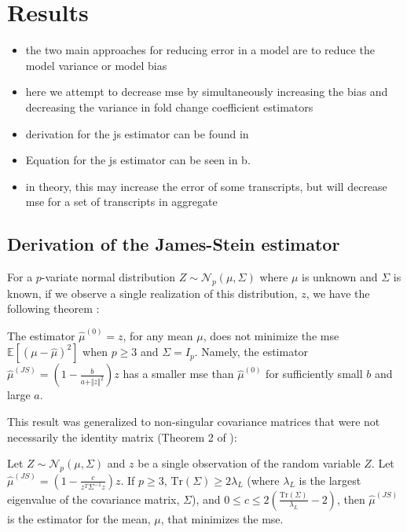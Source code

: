 \section{Results}

\begin{itemize}
  \item the two main approaches for reducing error in a model are to reduce the model variance or model bias 
  \item here we attempt to decrease \gls{mse} by simultaneously increasing the bias and decreasing the variance in fold change coefficient estimators
  \item derivation for the \gls{js} estimator can be found in 
  \item Equation for the \gls{js} estimator can be seen in b. 
  \item in theory, this may increase the error of some transcripts, but will decrease \gls{mse} for a set of transcripts in aggregate 
\end{itemize}

\subsection{Derivation of the James-Stein estimator}
\label{sec:JS_derivation}

For a $p$-variate normal distribution $Z \sim \mathcal{N}_p(\mu, \Sigma)$ where $\mu$ is unknown and $\Sigma$ is known, if we observe a single realization of this distribution, $z$, we have the following theorem \cite{steinInadmissibilityUsualEstimator1956}:

\begin{theorem}
  The estimator $\hat{\mu}^{(0)} = z$, for any mean $\mu$, does not minimize the \gls{mse} $\mathbb{E} \left[ (\mu - \hat{\mu})^2 \right]$ when $p \ge 3$ and $\Sigma = I_p$. Namely, the estimator $\hat{\mu}^{(JS)} = \left( 1 - \frac{b}{a + \Vert z \Vert ^2}\right) z$ has a smaller \gls{mse} than $\hat{\mu}^{(0)}$ for sufficiently small $b$ and large $a$.
\end{theorem}

This result was generalized to non-singular covariance matrices that were not necessarily the identity matrix (Theorem 2 of \cite[REF][]{bockMinimaxEstimatorsMean1975}):

\begin{theorem}
  Let $Z \sim \mathcal{N}_p \left(\mu, \Sigma \right)$ and $z$ be a single observation of the random variable $Z$.
  Let $\hat{\mu}^{(JS)} = \left( 1 - \frac{c}{z^T \Sigma^{-1} z}\right) z$.
If $p \ge 3$, $\text{Tr}(\Sigma) \ge 2 \lambda_L$ (where $\lambda_L$ is the largest eigenvalue of the covariance matrix, $\Sigma$), and $0 \le c \le 2 \left( \frac{\text{Tr}(\Sigma)}{\lambda_L} - 2 \right)$, then $\hat{\mu}^{(JS)}$ is the estimator for the mean, $\mu$, that minimizes the \gls{mse}.
\end{theorem}

